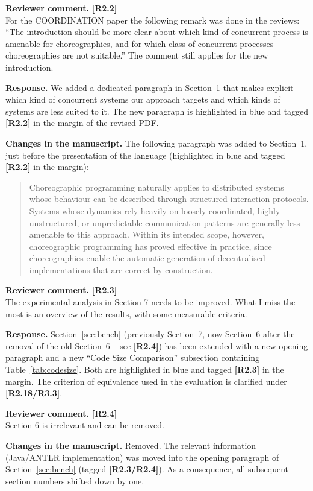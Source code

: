 \documentclass[11pt]{article}
\newcommand{\revcomment}[1]{%
  \begin{reviewercomment}
  \textbf{Reviewer comment.} #1
  \end{reviewercomment}
}
\newcommand{\revresponse}[2][]{%
  \par\noindent\textbf{Response.} #1 #2
}
\newcommand{\revchanges}[2][]{%
  \par\noindent\textbf{Changes in the manuscript.} #1
  #2\par\bigskip
}
\begin{document}
\revcomment{\textbf{[R2.2]}\\
For the COORDINATION paper the following remark was done in the
reviews: ``The introduction should be more clear about which kind of
concurrent process is amenable for choreographies, and for which
class of concurrent processes choreographies are not suitable.'' The
comment still applies for the new introduction.
}

\revresponse{ We added a dedicated paragraph in Section~1 that makes
  explicit which kind of concurrent systems our approach targets and
  which kinds of systems are less suited to it. The new paragraph is
  highlighted in blue and tagged \textbf{[R2.2]} in the margin of the
  revised PDF.}

\revchanges{ The following paragraph was added to Section~1, just
  before the presentation of the language (highlighted in blue and
  tagged \textbf{[R2.2]} in the margin):
  \begin{quote}\small
    Choreographic programming naturally applies to distributed
    systems whose behaviour can be described through structured
    interaction protocols. Systems whose dynamics rely heavily on
    loosely coordinated, highly unstructured, or unpredictable
    communication patterns are generally less amenable to this
    approach. Within its intended scope, however, choreographic
    programming has proved effective in practice, since
    choreographies enable the automatic generation of decentralised
    implementations that are correct by construction.
  \end{quote}
}

  
\revcomment{\textbf{[R2.3]}\\
The experimental analysis in Section 7 needs to be improved. What I
miss the most is an overview of the results, with some measurable
criteria.
}

\revresponse{ Section~\ref{sec:bench} (previously Section~7, now
  Section~6 after the removal of the old Section~6 -- see
  \textbf{[R2.4]}) has been extended with a new opening paragraph
  and a new ``Code Size Comparison'' subsection containing
  Table~\ref{tab:codesize}. Both are highlighted in blue and tagged
  \textbf{[R2.3]} in the margin. The criterion of equivalence used
  in the evaluation is clarified under \textbf{[R2.18/R3.3]}.}

\revcomment{\textbf{[R2.4]}\\
Section 6 is irrelevant and can be removed.
}

\revchanges{ Removed. The relevant information (Java/ANTLR
  implementation) was moved into the opening paragraph of
  Section~\ref{sec:bench} (tagged \textbf{[R2.3/R2.4]}). As a
  consequence, all subsequent section numbers shifted down by one.}
\end{document}

